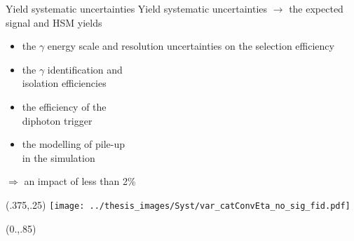 \documentclass[10pt,UKenglish, leqno, xcolor = dvipsnames]{beamer}
\begin{document}
	\begin{frame}{Yield systematic uncertainties}
		\vspace{.2cm}
		Yield systematic uncertainties $\to$ the expected signal and HSM yields
		\begin{itemize}
			\item the $\gamma$ energy scale and resolution uncertainties on the selection efficiency
			\item the $\gamma$ identification and\\ isolation efficiencies
			\item the efficiency of the\\ diphoton trigger
			\item  the modelling of pile-up\\ in the simulation\\
			\vspace{.1cm}
		\end{itemize}
		$\Rightarrow$ an impact of less than 2\%
		\begin{textblock}{1}(.375,.25)
			\texttt{[image: ../thesis\_images/Syst/var\_catConvEta\_no\_sig\_fid.pdf]}\\	
		\end{textblock}
		\begin{textblock}{1}(0.,.85)
			\begin{figure}
			\end{figure}
		\end{textblock}
	\end{frame}
\end{document}
